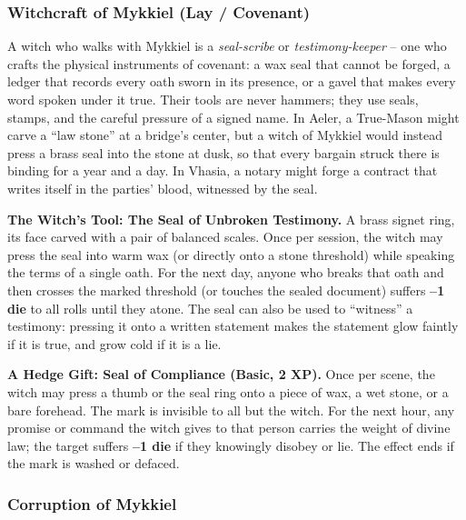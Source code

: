 \subsubsection*{Witchcraft of Mykkiel (Lay / Covenant)}

A witch who walks with Mykkiel is a \textit{seal-scribe} or \textit{testimony-keeper} -- one who crafts the physical instruments of covenant: a wax seal that cannot be forged, a ledger that records every oath sworn in its presence, or a gavel that makes every word spoken under it true. Their tools are never hammers; they use seals, stamps, and the careful pressure of a signed name. In Aeler, a True-Mason might carve a ``law stone'' at a bridge's center, but a witch of Mykkiel would instead press a brass seal into the stone at dusk, so that every bargain struck there is binding for a year and a day. In Vhasia, a notary might forge a contract that writes itself in the parties' blood, witnessed by the seal.

\textbf{The Witch's Tool: The Seal of Unbroken Testimony.} A brass signet ring, its face carved with a pair of balanced scales. Once per session, the witch may press the seal into warm wax (or directly onto a stone threshold) while speaking the terms of a single oath. For the next day, anyone who breaks that oath and then crosses the marked threshold (or touches the sealed document) suffers \textbf{--1 die} to all rolls until they atone. The seal can also be used to ``witness'' a testimony: pressing it onto a written statement makes the statement glow faintly if it is true, and grow cold if it is a lie.

\textbf{A Hedge Gift: Seal of Compliance (Basic, 2 XP).} Once per scene, the witch may press a thumb or the seal ring onto a piece of wax, a wet stone, or a bare forehead. The mark is invisible to all but the witch. For the next hour, any promise or command the witch gives to that person carries the weight of divine law; the target suffers \textbf{--1 die} if they knowingly disobey or lie. The effect ends if the mark is washed or defaced.

\subsubsection*{Corruption of Mykkiel}

